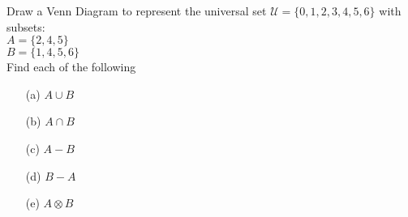 \documentclass[MASTER.tex]{subfiles}
\begin{document}
Draw a Venn Diagram to represent the universal set
$\mathcal{U} = \{0,1,2,3,4,5,6\}$ with subsets:\\
$A = \{2,4,5\}$\\
$B = \{1,4,5,6\}$\\

\noindent Find each of the following
\begin{itemize}
\item[(a)] $A \cup B $
\item[(b)] $A \cap B $
\item[(c)] $A-B$
\item[(d)] $B-A$
\item[(e)] $A \otimes B$
\end{itemize}
\end{document}
